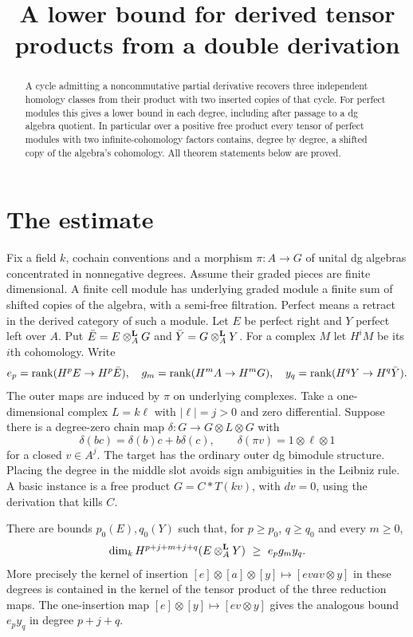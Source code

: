 \documentclass[11pt]{article}
\title{A lower bound for derived tensor products from a double derivation}
\author{\workingauthor}\date{\coursedate}
\begin{document}
\maketitle
\begin{abstract}
A cycle admitting a noncommutative partial derivative recovers three
independent homology classes from their product with two inserted copies
of that cycle. For perfect modules this gives a lower bound in each
degree, including after passage to a dg algebra quotient. In particular
over a positive free product every tensor of perfect modules with two
infinite-cohomology factors contains, degree by degree, a shifted copy of
the algebra's cohomology. All theorem statements below are proved.
\end{abstract}

\section{The estimate}
Fix a field $k$, cochain conventions and a morphism $\pi:A\to G$ of unital
dg algebras concentrated in nonnegative degrees. Assume their graded pieces
are finite dimensional. A finite cell module has underlying graded module
a finite sum of shifted copies of the algebra, with a semi-free
filtration. Perfect means a retract in the derived category of such a
module. Let $E$ be perfect right and $Y$ perfect left over $A$.
Put $\bar E=E\otimes^{\mathbf L}_A G$ and $\bar Y=G\otimes^{\mathbf L}_A Y$. For a complex $M$ let
$H^iM$ be its $i$th cohomology. Write
\[
 e_p=\operatorname{rank}(H^pE\to H^p\bar E),\quad
 g_m=\operatorname{rank}(H^m A\to H^m G),\quad
 y_q=\operatorname{rank}(H^qY\to H^q\bar Y).
\]
The outer maps are induced by $\pi$ on underlying complexes.
Take a one-dimensional complex $L=k\ell$ with $|\ell|=j>0$ and zero
differential. Suppose there is a degree-zero chain map
$\delta:G\to G\otimes L\otimes G$ with
\[
 \delta(bc)=\delta(b)c+b\delta(c),\qquad
 \delta(\pi v)=1\otimes\ell\otimes1
\]
for a closed $v\in A^j$. The target has the ordinary outer dg bimodule
structure. Placing the degree in the middle slot avoids sign ambiguities
in the Leibniz rule. A basic instance is a free product $G=C*T(kv)$,
with $dv=0$, using the derivation that kills $C$.

\begin{thm}\label{cut}
There are bounds $p_0(E),q_0(Y)$ such that, for $p\ge p_0$,
$q\ge q_0$ and every $m\ge0$,
\[
          \dim_k H^{p+j+m+j+q}(E\otimes^{\mathbf L}_A Y)\ \ge\ e_p g_m y_q .
\]
More precisely the kernel of insertion $[e]\otimes[a]\otimes[y]
\mapsto[e v a v\otimes y]$ in these degrees is contained in the kernel
of the tensor product of the three reduction maps. The one-insertion
map $[e]\otimes[y]\mapsto[e v\otimes y]$ gives the analogous bound
$e_p y_q$ in degree $p+j+q$.
\end{thm}
\end{document}
